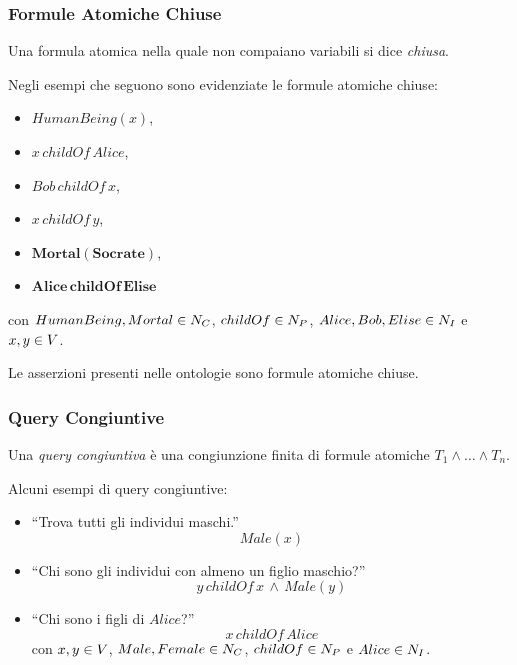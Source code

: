 \documentclass[8pt]{beamer}
\begin{document}
\begin{frame}
\frametitle{Formule Atomiche Chiuse}
Una formula atomica nella quale non compaiano variabili si dice \emph{chiusa}.
\vspace{\baselineskip}

Negli esempi che seguono sono evidenziate le formule atomiche chiuse:
\begin{itemize}
 \item $HumanBeing(x)$,
 \item $x\,childOf\,Alice$,
 \item $Bob\,childOf\,x$,
 \item $x\,childOf\,y$,
 \item $\mathbf{Mortal(Socrate)}$,
 \item $\mathbf{Alice\,childOf\,Elise}$
\end{itemize}
con $HumanBeing, Mortal \in N_C$, $childOf \in N_P$, 
$Alice, Bob, Elise \in N_I$ e $x, y \in V$.
\vspace{\baselineskip}

Le asserzioni presenti nelle ontologie sono formule atomiche chiuse.
\end{frame}

\begin{frame}
\frametitle{Query Congiuntive}
Una \emph{query congiuntiva} \`e una congiunzione finita di formule atomiche $T_1 \wedge \ldots \wedge T_n$.
\vspace{\baselineskip}

Alcuni esempi di query congiuntive:
\begin{itemize}
 \item ``Trova tutti gli individui maschi.''
 \[
  Male(x)
 \]
 \item ``Chi sono gli individui con almeno un figlio maschio?''
\[
 y\,childOf\,x\,\wedge\,Male(y)  
\]
 \item ``Chi sono i figli di $Alice$?''
\[
 x\,childOf\,Alice
\]
con $x, y \in V$, $Male, Female \in N_C$, $childOf \in N_P$ e $Alice \in N_I$.
 \end{itemize}
\end{frame}
\end{document}
